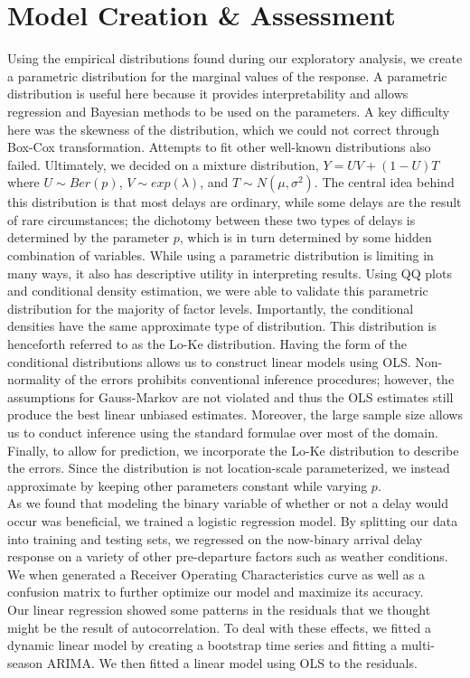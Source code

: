 \documentclass[12pt, a4paper, openany]{book}
\newcommand\tab[1][1cm]{\hspace*{#1}}
\begin{document}
	\section{Model Creation \& Assessment}
\tab Using the empirical distributions found during our exploratory analysis, we create a parametric distribution for the marginal values of the response. A parametric distribution is useful here because it provides interpretability and allows regression and Bayesian methods to be used on the parameters. A key difficulty here was the skewness of the distribution, which we could not correct through Box-Cox transformation. Attempts to fit other well-known distributions also failed. Ultimately, we decided on a mixture distribution, $Y = UV+(1-U)T$ where $U\sim Ber(p)$, $V\sim exp(\lambda)$, and $T\sim N(\mu, \sigma^2)$. The central idea behind this distribution is that most delays are ordinary, while some delays are the result of rare circumstances; the dichotomy between these two types of delays is determined by the parameter $p$, which is in turn determined by some hidden combination of variables. While using a parametric distribution is limiting in many ways, it also has descriptive utility in interpreting results. Using QQ plots and conditional density estimation, we were able to validate this parametric distribution for the majority of factor levels. Importantly, the conditional densities have the same approximate type of distribution. This distribution is henceforth referred to as the Lo-Ke distribution.
\tab Having the form of the conditional distributions allows us to construct linear models using OLS. Non-normality of the errors prohibits conventional inference procedures; however, the assumptions for Gauss-Markov are not violated and thus the OLS estimates still produce the best linear unbiased estimates. Moreover, the large sample size allows us to conduct inference using the standard formulae over most of the domain. Finally, to allow for prediction, we incorporate the Lo-Ke distribution to describe the errors. Since the distribution is not location-scale parameterized, we instead approximate by keeping other parameters constant while varying $p$. \\
\tab As we found that modeling the binary variable of whether or not a delay would occur was beneficial, we trained a logistic regression model. By splitting our data into training and testing sets, we regressed on the now-binary arrival delay response on a variety of other pre-departure factors such as weather conditions. We when generated a Receiver Operating Characteristics curve as well as a confusion matrix to further optimize our model and maximize its accuracy. \\
\tab Our linear regression showed some patterns in the residuals that we thought might be the result of autocorrelation. To deal with these effects, we fitted a dynamic linear model by creating a bootstrap time series and fitting a multi-season ARIMA. We then fitted a linear model using OLS to the residuals. 
\end{document}
